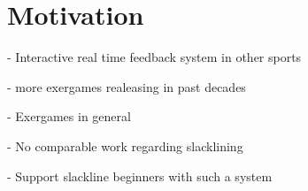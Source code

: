 \section{Motivation}
- Interactive real time feedback system in other sports

- more exergames realeasing in past decades

- Exergames in general

- No comparable work regarding slacklining

- Support slackline beginners with such a system